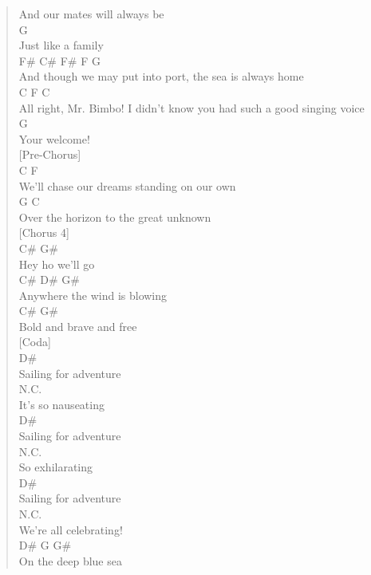 \documentclass[11pt]{article}
\begin{document}
\begin{verse}
And our mates will always be\\
\hspace*{5em}G\\
Just like a family\\
\hspace*{4em}F\#                C\#             F\#            F    G\\
And though we may put into port, the sea is always home\\
C                     F                                 C\\
All right, Mr. Bimbo! I didn't know you had such a good singing voice\\
\hspace*{3em}G\\
Your welcome!\\
\vspace*{1em}
[Pre-Chorus]\\
C                               F\\
We'll chase our dreams standing on our own\\
G                       C\\
Over the horizon to the great unknown\\
\vspace*{1em}
[Chorus 4]\\
C\#     G\#\\
Hey ho we'll go\\
C\# D\#        G\#\\
Anywhere the wind is blowing\\
C\#       G\#\\
Bold and brave and free\\
\vspace*{1em}
[Coda]\\
D\#\\
Sailing for adventure\\
N.C.\\
It's so nauseating\\
D\#\\
Sailing for adventure\\
N.C.\\
So exhilarating\\
D\#\\
Sailing for adventure\\
N.C.\\
We're all celebrating!\\
D\#     G         G\#\\
On the deep blue sea\\
\end{verse}
\clearpage
\end{document}
